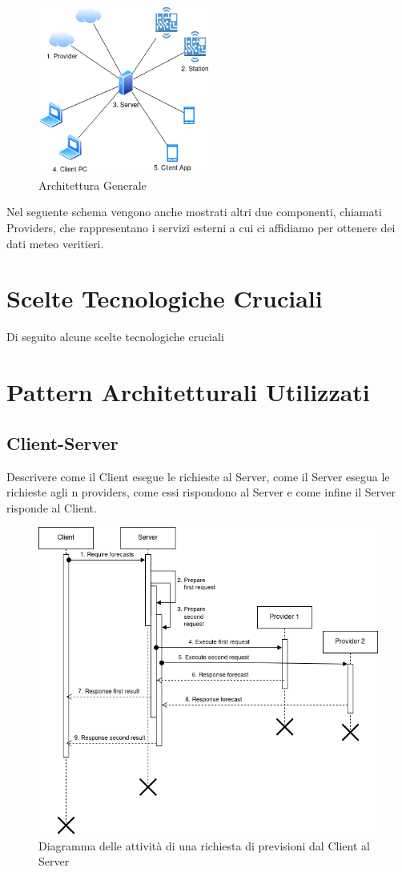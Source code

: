     \begin{figure}[H]
        \caption{Architettura Generale}
        \label{fig:General}
        \centering
        \includegraphics[width=0.5\textwidth]{DrawIo/General.png}
    \end{figure}
    
    \par Nel seguente schema vengono anche mostrati altri due componenti, chiamati Providers, che rappresentano i servizi esterni a cui ci affidiamo per ottenere dei dati meteo veritieri.
    
    \section{Scelte Tecnologiche Cruciali}
    Di seguito alcune scelte tecnologiche cruciali

    \section{Pattern Architetturali Utilizzati}
        \subsection{Client-Server}
        Descrivere come il Client esegue le richieste al Server, come il Server esegua le richieste agli n providers, come essi rispondono al Server e come infine il Server risponde al Client.
    
    \begin{figure}[H]
        \caption{Diagramma delle attività di una richiesta di previsioni dal Client al Server}
        \label{fig:Forecast Request Activity Diagram}
        \centering
        \includegraphics[width=1\textwidth]{DrawIo/forecast_request_activity_diagram.png}
    \end{figure}